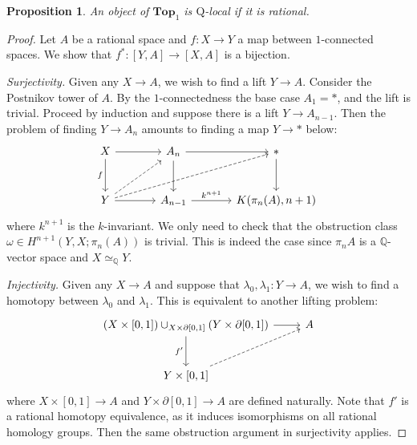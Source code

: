 \documentclass[psamsfonts]{amsart}
\newtheorem{prop}{Proposition}[section]
\theoremstyle{definition}
\newcommand{\Q}{\mathbb{Q}}
\newcommand{\Top}{\mathbf{Top}}
\numberwithin{equation}{section}
\begin{document}
\begin{prop}
An object of $\Top_1$ is $\mathrm{Q}$-local if it is rational.
\end{prop}
\begin{proof}
Let $A$ be a rational space and $f:X\to Y$ a map between $1$-connected spaces. We show that $f^\ast:[Y,A]\to[X,A]$ is a bijection.\medbreak

\textit{Surjectivity.} Given any $X\to A$, we wish to find a lift $Y\to A$. Consider the Postnikov tower of $A$. By the $1$-connectedness the base case $A_1=\ast$, and the lift is trivial. Proceed by induction and suppose there is a lift $Y\to A_{n-1}$. Then the problem of finding $Y\to A_n$ amounts to finding a map $Y\to\ast$ below:
\[\begin{tikzcd}[column sep=large, row sep=large]
X\arrow[d,"f"']\arrow[r]&A_n\arrow[d]\arrow[r]&\ast\arrow[d]\\
Y\arrow[r]\arrow[urr,dashed]\arrow[ur,dashed]&A_{n-1}\arrow[r,"k^{n+1}"]&K(\pi_n(A),n+1)
\end{tikzcd}\]
where $k^{n+1}$ is the $k$-invariant. We only need to check that the obstruction class $\omega\in H^{n+1}(Y,X;\pi_n(A))$ is trivial. This is indeed the case since $\pi_nA$ is a $\Q$-vector space and $X\simeq_\Q Y$.\medbreak

\textit{Injectivity.} Given any $X\to A$ and suppose that $\lambda_0,\lambda_1:Y\to A$, we wish to find a homotopy between $\lambda_0$ and $\lambda_1$. This is equivalent to another lifting problem:
\[\begin{tikzcd}[row sep=large]
(X\times[0,1])\cup_{X\times\partial[0,1]}(Y\times\partial[0,1])\arrow[r]\arrow[d,"f'"']&A\\
Y\times[0,1]\arrow[ur,dashed]
\end{tikzcd}\]
where $X\times[0,1]\to A$ and $Y\times\partial[0,1]\to A$ are defined naturally. Note that $f'$ is a rational homotopy equivalence, as it induces isomorphisms on all rational homology groups. Then the same obstruction argument in surjectivity applies.
\end{proof}
\end{document}
